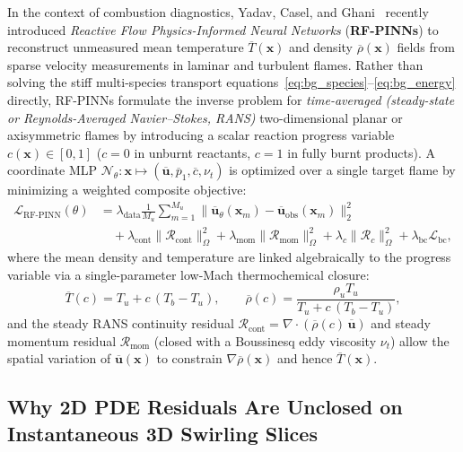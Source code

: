 In the context of combustion diagnostics, Yadav, Casel, and Ghani~\cite{yadav2025rfpinns} recently introduced \emph{Reactive Flow Physics-Informed Neural Networks} (\textbf{RF-PINNs}) to reconstruct unmeasured mean temperature $\overline{T}(\mathbf{x})$ and density $\overline{\rho}(\mathbf{x})$ fields from sparse velocity measurements in laminar and turbulent flames. Rather than solving the stiff multi-species transport equations~\eqref{eq:bg_species}--\eqref{eq:bg_energy} directly, RF-PINNs formulate the inverse problem for \emph{time-averaged (steady-state or Reynolds-Averaged Navier--Stokes, RANS)} two-dimensional planar or axisymmetric flames by introducing a scalar reaction progress variable $c(\mathbf{x}) \in [0, 1]$ ($c=0$ in unburnt reactants, $c=1$ in fully burnt products). A coordinate MLP $\mathcal{N}_\theta : \mathbf{x} \mapsto (\overline{\mathbf{u}}, \overline{p}_1, \overline{c}, \nu_t)$ is optimized over a single target flame by minimizing a weighted composite objective:
\begin{equation}
\begin{aligned}
    \mathcal{L}_{\text{RF-PINN}}(\theta) &= \lambda_{\text{data}} \frac{1}{M_u}\sum_{m=1}^{M_u} \|\overline{\mathbf{u}}_\theta(\mathbf{x}_m) - \overline{\mathbf{u}}_{\text{obs}}(\mathbf{x}_m)\|_2^2 \\
    &\quad + \lambda_{\text{cont}} \|\mathcal{R}_{\text{cont}}\|_{\Omega}^2 + \lambda_{\text{mom}} \|\boldsymbol{\mathcal{R}}_{\text{mom}}\|_{\Omega}^2 + \lambda_c \|\mathcal{R}_c\|_{\Omega}^2 + \lambda_{\text{bc}} \mathcal{L}_{\text{bc}},
\end{aligned}
\label{eq:bg_rfpinn_loss}
\end{equation}
where the mean density and temperature are linked algebraically to the progress variable via a single-parameter low-Mach thermochemical closure:
\begin{equation}
    \overline{T}(c) = T_u + c\,(T_b - T_u), \qquad \overline{\rho}(c) = \frac{\rho_u T_u}{T_u + c\,(T_b - T_u)},
    \label{eq:bg_rfpinn_closure}
\end{equation}
and the steady RANS continuity residual $\mathcal{R}_{\text{cont}} = \nabla \cdot (\overline{\rho}(c)\,\overline{\mathbf{u}})$ and steady momentum residual $\boldsymbol{\mathcal{R}}_{\text{mom}}$ (closed with a Boussinesq eddy viscosity $\nu_t$) allow the spatial variation of $\overline{\mathbf{u}}(\mathbf{x})$ to constrain $\nabla \overline{\rho}(\mathbf{x})$ and hence $\overline{T}(\mathbf{x})$.

\subsection{Why 2D PDE Residuals Are Unclosed on Instantaneous 3D Swirling Slices}
\label{subsec:bg_pde_unclosed}

